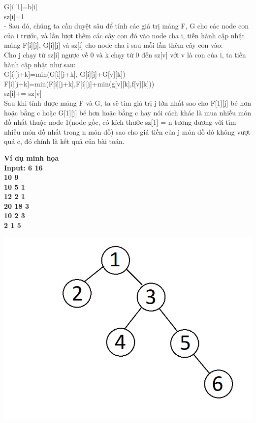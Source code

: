 \documentclass[10pt,a4paper]{article}
\begin{document}
\begin{flushleft}
\hspace{2 cm} G[i][1]=b[i]\\
\hspace{2 cm} sz[i]=1\\
\hspace{1 cm}- Sau đó, chúng ta cần duyệt sâu để tính các giá trị mảng F, G cho các node con của i trước, và lần lượt thêm các cây con đó vào node cha i, tiến hành cập nhật mảng F[i][j], G[i][j] và sz[i] cho node cha i sau mỗi lần thêm cây con vào:\\
\hspace{2 cm} Cho j chạy từ sz[i] ngược về 0 và k chạy từ 0 đến sz[v] với v là con của i, ta tiến hành cập nhật như sau:\\
\hspace{3 cm} G[i][j+k]=min(G[i][j+k], G[i][j]+G[v][k])\\
\hspace{3 cm} F[i][j+k]=min(F[i][j+k],F[i][j]+min(g[v][k],f[v][k]))\\
\hspace{2 cm} sz[i]+= sz[v]\\
\vspace{0.5 cm}
Sau khi tính được mảng F và G, ta sẽ tìm giá trị j lớn nhất sao cho F[1][j] bé hơn hoặc bằng c hoặc G[1][j] bé hơn hoặc bằng c hay nói cách khác là mua nhiều món đồ nhất thuộc node 1(node gốc, có kích thước sz[1] = n tương đương với tìm nhiều món đồ nhất trong n món đồ) sao cho giá tiền của j món đồ đó không vượt quá c, đó chính là kết quả của bài toán.
\end{flushleft}
\fontsize{14}{20}\selectfont
\bfseries 
Ví dụ minh họa\\
\mdseries
Input:
6 16\\
10 9\\
10 5 1\\
12 2 1\\
20 18 3\\
10 2 3\\
2 1 5\\
\begin{center}
     \includegraphics[scale=.5]{vidu.png} \\
\end{center}
\end{document}
